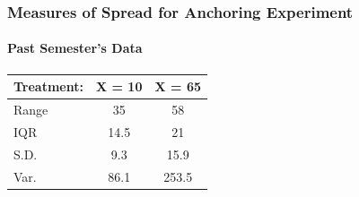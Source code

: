 \begin{frame}
\frametitle{Measures of Spread for Anchoring Experiment}
\framesubtitle{Past Semester's Data}

\begin{table}
	\begin{tabular}{l|cc}
	Treatment: & X = 10 & X = 65\\
	\hline
		Range&35&58\\
		IQR&14.5&21\\
		S.D.&9.3&15.9\\
		Var.&86.1&253.5
	\end{tabular}
\end{table}
\end{frame}


